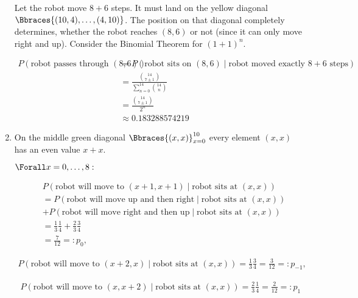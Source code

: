 \begin{solution}
\begin{enumerate}[label = (\alph*)]
    Let the robot move $8 + 6$ steps.
    It must land on the yellow diagonal $\Bbraces{(10, 4), \dots, (4, 10)}$.
    The position on that diagonal completely determines, whether the robot reaches $(8, 6)$ or not (since it can only move right and up).
    Consider the Binomial Theorem for $(1 + 1)^n$.
    
    \begin{align*}
        P(\text{robot passes through $(8, 6)$})
        & =
        P(\text{robot sits on $(8, 6)$} \mid \text{robot moved exactly $8 + 6$ steps}) \\
        & =
        \frac
        {
            \binom{14}{7 \pm 1}
        }{
            \sum_{n=0}^{14}
                \binom{14}{n}
        } \\
        & =
        \frac{\binom{14}{7 \pm 1}}{2^n} \\
        & \approx
        0.183288574219
    \end{align*}

    \item On the middle green diagonal $\Bbraces{(x, x)}_{x=0}^{10}$ every element $(x, x)$ has an even value $x + x$.

    $\Forall x = 0, \dots, 8:$

    \begin{align*}
        &
        P(\text{robot will move to $(x+1, x+1)$} \mid \text{robot sits at $(x, x)$}) \\
        & =
        P(\text{robot will move up and then right} \mid \text{robot sits at $(x, x)$}) \\
        & +
        P(\text{robot will move right and then up} \mid \text{robot sits at $(x, x)$}) \\
        & =
        \frac{1}{3} \frac{1}{4} + \frac{2}{3} \frac{3}{4} \\
        & =
        \frac{7}{12} =: p_0,
    \end{align*}

    \begin{align*}
        P(\text{robot will move to $(x+2, x)$} \mid \text{robot sits at $(x, x)$})
        =
        \frac{1}{3} \frac{3}{4}
        =
        \frac{3}{12} =: p_{-1},
    \end{align*}

    \begin{align*}
        P(\text{robot will move to $(x, x+2)$} \mid \text{robot sits at $(x, x)$})
        =
        \frac{2}{3} \frac{1}{4}
        =
        \frac{2}{12} =: p_1
    \end{align*}


\end{enumerate}
\end{solution}
